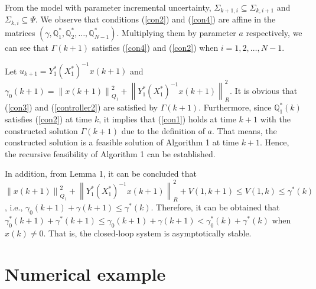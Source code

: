\documentclass{singlecol-new}
\theoremstyle{TH}{
\newtheorem{lemma}{Lemma}
\newtheorem{theorem}[lemma]{Theorem}
\newtheorem{corrolary}[lemma]{Corrolary}
\newtheorem{conjecture}[lemma]{Conjecture}
\newtheorem{proposition}[lemma]{Proposition}
\newtheorem{claim}[lemma]{Claim}
\newtheorem{stheorem}[lemma]{Wrong Theorem}
\newtheorem{algorithm}{Algorithm}
}
\theoremstyle{THrm}{
\newtheorem{definition}{Definition}[section]
\newtheorem{question}{Question}[section]
\newtheorem{remark}{Remark}
\newtheorem{scheme}{Scheme}
}
\theoremstyle{THhit}{
\newtheorem{case}{Case}[section]
}
\begin{document}

From the model with parameter incremental uncertainty, $ \Sigma_{k +
1,i} \subseteq \Sigma_{k,i+1}$ and $\Sigma _{k,i} \subseteq \Psi $.
We observe that conditions (\ref{con2}) and (\ref{con4}) are affine
in the matrices $(\gamma ,\mathbb{Q}_1^* ,\mathbb{Q}_2^* , \ldots
,\mathbb{Q}_{N - 1}^* )$. Multiplying them by parameter $a$
respectively, we can see that $\Gamma (k + 1)$ satisfies
(\ref{con4}) and (\ref{con2}) when $i = 1,2, \ldots ,N - 1$.

Let $u_{k + 1}  = Y_1^ * (X_1^ *  )^{ - 1} x(k + 1)$ and $\gamma_0
(k + 1) = \left\| {x(k + 1)} \right\|_{Q_1 }^2  + \left\| {Y_1^*
(X_1^*)^{-1} x(k + 1)} \right\|_R^2 $. It is obvious that
(\ref{con3}) and (\ref{controller2}) are satisfied by $\Gamma (k +
1)$. Furthermore, since $\mathbb{Q}_1^*(k)$ satisfies (\ref{con2})
at time $k$, it implies that (\ref{con1}) holds at time $k+1$ with
the constructed solution $\Gamma (k + 1)$ due to the definition of
$a$. That means, the constructed solution is a feasible solution of
Algorithm 1 at time $k+1$. Hence, the recursive feasibility of
Algorithm 1 can be established.

In addition, from Lemma 1, it can be concluded that $\left\| {x(k +
1)} \right\|_{Q_1 }^2  + \left\| {Y_1^ * (X_1^* )^{ - 1} x(k + 1)}
\right\|_R^2  + V(1,k + 1) \leq V(1,k) \leq\gamma^*(k)$, i.e.,
$\gamma_0(k+1)+\gamma(k+1) \leq\gamma ^ * (k)$. Therefore, it can be
obtained that $\gamma _0^ * (k + 1) + \gamma ^
*  (k + 1) \leq \gamma_0(k+1)+\gamma(k+1)
< \gamma _0^* (k) + \gamma ^*  (k)$ when $x(k)\neq 0$. That is, the
closed-loop system is asymptotically stable.
\endproof

\section{Numerical example}

\end{document}
